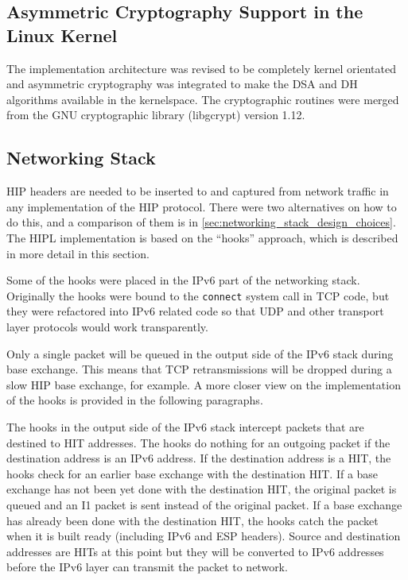 \subsection{Asymmetric Cryptography Support in the Linux Kernel}

The implementation architecture was revised to be completely kernel
orientated and asymmetric cryptography was integrated to make the
\ac{DSA} and \ac{DH} algorithms available in the kernelspace. The
cryptographic routines were merged from the GNU cryptographic library
(libgcrypt) version 1.12.

\subsection{Networking Stack}
\label{sec:networking_stack_architecture}

\ac{HIP} headers are needed to be inserted to and captured from
network traffic in any implementation of the \ac{HIP} protocol. There
were two alternatives on how to do this, and a comparison of them is
in \autoref{sec:networking_stack_design_choices}. The \ac{HIPL}
implementation is based on the ``hooks'' approach, which is described
in more detail in this section.

Some of the hooks were placed in the IPv6 part of the networking
stack. Originally the hooks were bound to the \verb|connect| system
call in \ac{TCP} code, but they were refactored into IPv6 related code
so that \ac{UDP} and other transport layer protocols would work
transparently.

Only a single packet will be queued in the output side of the IPv6
stack during base exchange. This means that \ac{TCP} retransmissions
will be dropped during a slow \ac{HIP} base exchange, for example. A
more closer view on the implementation of the hooks is provided in the
following paragraphs.

The hooks in the output side of the IPv6 stack intercept packets that
are destined to \ac{HIT} addresses. The hooks do nothing for an
outgoing packet if the destination address is an IPv6 address. If the
destination address is a \ac{HIT}, the hooks check for an earlier base
exchange with the destination \ac{HIT}. If a base exchange has not
been yet done with the destination \ac{HIT}, the original packet is
queued and an I1 packet is sent instead of the original packet. If a
base exchange has already been done with the destination HIT, the
hooks catch the packet when it is built ready (including IPv6 and
\ac{ESP} headers). Source and destination addresses are \acp{HIT} at
this point but they will be converted to IPv6 addresses before the
IPv6 layer can transmit the packet to network.

